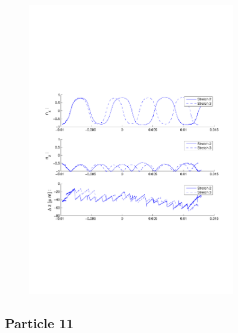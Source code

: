 \begin{figure}[H]
\centering
\includegraphics[width=0.8\textwidth]{Images/Particle 4/Stretch2.pdf}
\end{figure}


\subsection{Particle 11}

